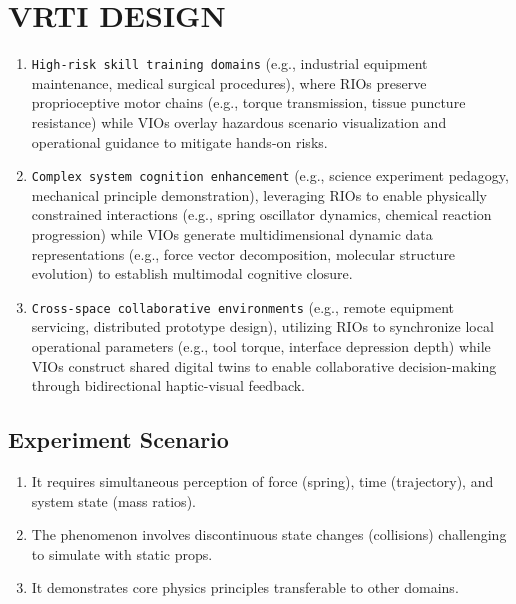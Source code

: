 \section{VRTI DESIGN}


\begin{enumerate}
  \item \texttt{High-risk skill training domains} (e.g., industrial equipment maintenance, medical surgical procedures), where RIOs preserve proprioceptive motor chains (e.g., torque transmission, tissue puncture resistance) while VIOs overlay hazardous scenario visualization and operational guidance to mitigate hands-on risks.
  \item \texttt{Complex system cognition enhancement} (e.g., science experiment pedagogy, mechanical principle demonstration), leveraging RIOs to enable physically constrained interactions (e.g., spring oscillator dynamics, chemical reaction progression) while VIOs generate multidimensional dynamic data representations (e.g., force vector decomposition, molecular structure evolution) to establish multimodal cognitive closure.
  \item \texttt{Cross-space collaborative environments} (e.g., remote equipment servicing, distributed prototype design), utilizing RIOs to synchronize local operational parameters (e.g., tool torque, interface depression depth) while VIOs construct shared digital twins to enable collaborative decision-making through bidirectional haptic-visual feedback.
\end{enumerate}


\subsection{Experiment Scenario}
\begin{enumerate}
    \item It requires simultaneous perception of force (spring), time (trajectory), and system state (mass ratios).
    \item The phenomenon involves discontinuous state changes (collisions) challenging to simulate with static props.
    \item It demonstrates core physics principles transferable to other domains.
\end{enumerate}

